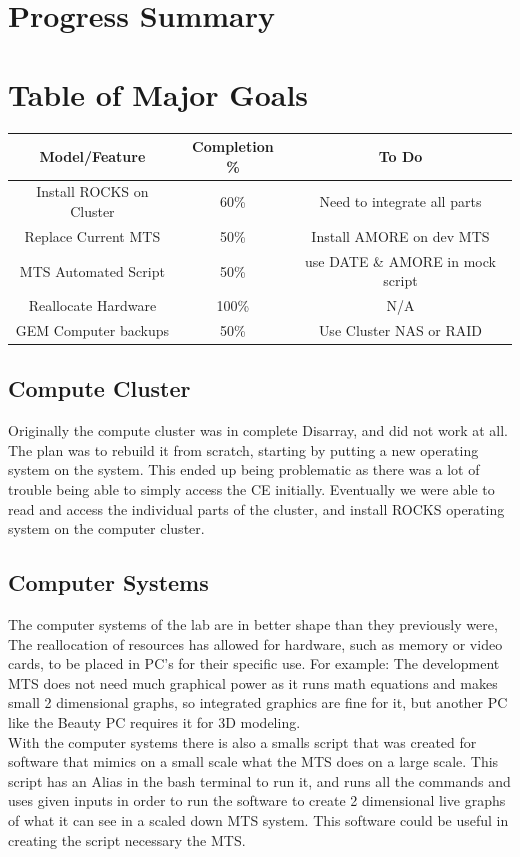 \documentclass[12pt]{article}
\newcommand\tab[1][1cm]{\hspace*{#1}}
\begin{document}
\section{Progress Summary}

\section{Table of Major Goals}
\begin{tabular}{|c|c|c|}
	\hline
	Model/Feature & Completion \% & To Do \\
	\hline
	Install ROCKS on Cluster & 60\% & Need to integrate all parts \\
	\hline
	Replace Current MTS & 50\% & Install AMORE on dev MTS \\
	\hline
	MTS Automated Script & 50\% & use DATE \& AMORE in mock script \\
	\hline
	Reallocate Hardware & 100\% & N/A \\
	\hline
	GEM Computer backups & 50\% & Use Cluster NAS or RAID \\
	\hline
	
\end{tabular}
\subsection{Compute Cluster}
\tab Originally the compute cluster was in complete Disarray, and did not work at all. The plan was to rebuild it from scratch, starting by putting a new operating system on the system. This ended up being problematic as there was a lot of trouble being able to simply access the CE initially. Eventually we were able to read and access the individual parts of the cluster, and install ROCKS operating system on the computer cluster. 
\subsection{Computer Systems}
\tab The computer systems of the lab are in better shape than they previously were, The reallocation of resources has allowed for hardware, such as memory or video cards, to be placed in PC's for their specific use. For example: The development MTS does not need much graphical power as it runs math equations and makes small 2 dimensional graphs, so integrated graphics are fine for it, but another PC like the Beauty PC requires it for 3D modeling. \\
\tab With the computer systems there is also a smalls script that was created for software that mimics on a small scale what the MTS does on a large scale. This script has an Alias in the bash terminal to run it, and runs all the commands and uses given inputs in order to run the software to create 2 dimensional live graphs of what it can see in a scaled down MTS system. This software could be useful in creating the script necessary the MTS.
\end{document}
